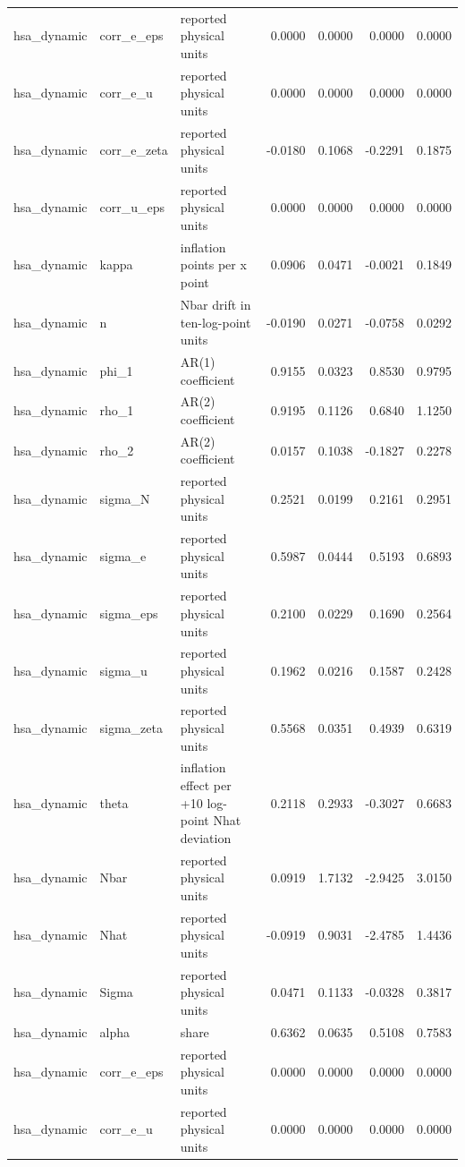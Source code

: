 \begin{tabular}{lllrrrr}
hsa\_dynamic & corr\_e\_eps & reported physical units & 0.0000 & 0.0000 & 0.0000 & 0.0000 \\
hsa\_dynamic & corr\_e\_u & reported physical units & 0.0000 & 0.0000 & 0.0000 & 0.0000 \\
hsa\_dynamic & corr\_e\_zeta & reported physical units & -0.0180 & 0.1068 & -0.2291 & 0.1875 \\
hsa\_dynamic & corr\_u\_eps & reported physical units & 0.0000 & 0.0000 & 0.0000 & 0.0000 \\
hsa\_dynamic & kappa & inflation points per x point & 0.0906 & 0.0471 & -0.0021 & 0.1849 \\
hsa\_dynamic & n & Nbar drift in ten-log-point units & -0.0190 & 0.0271 & -0.0758 & 0.0292 \\
hsa\_dynamic & phi\_1 & AR(1) coefficient & 0.9155 & 0.0323 & 0.8530 & 0.9795 \\
hsa\_dynamic & rho\_1 & AR(2) coefficient & 0.9195 & 0.1126 & 0.6840 & 1.1250 \\
hsa\_dynamic & rho\_2 & AR(2) coefficient & 0.0157 & 0.1038 & -0.1827 & 0.2278 \\
hsa\_dynamic & sigma\_N & reported physical units & 0.2521 & 0.0199 & 0.2161 & 0.2951 \\
hsa\_dynamic & sigma\_e & reported physical units & 0.5987 & 0.0444 & 0.5193 & 0.6893 \\
hsa\_dynamic & sigma\_eps & reported physical units & 0.2100 & 0.0229 & 0.1690 & 0.2564 \\
hsa\_dynamic & sigma\_u & reported physical units & 0.1962 & 0.0216 & 0.1587 & 0.2428 \\
hsa\_dynamic & sigma\_zeta & reported physical units & 0.5568 & 0.0351 & 0.4939 & 0.6319 \\
hsa\_dynamic & theta & inflation effect per +10 log-point Nhat deviation & 0.2118 & 0.2933 & -0.3027 & 0.6683 \\
hsa\_dynamic & Nbar & reported physical units & 0.0919 & 1.7132 & -2.9425 & 3.0150 \\
hsa\_dynamic & Nhat & reported physical units & -0.0919 & 0.9031 & -2.4785 & 1.4436 \\
hsa\_dynamic & Sigma & reported physical units & 0.0471 & 0.1133 & -0.0328 & 0.3817 \\
hsa\_dynamic & alpha & share & 0.6362 & 0.0635 & 0.5108 & 0.7583 \\
hsa\_dynamic & corr\_e\_eps & reported physical units & 0.0000 & 0.0000 & 0.0000 & 0.0000 \\
hsa\_dynamic & corr\_e\_u & reported physical units & 0.0000 & 0.0000 & 0.0000 & 0.0000 \\

\end{tabular}
